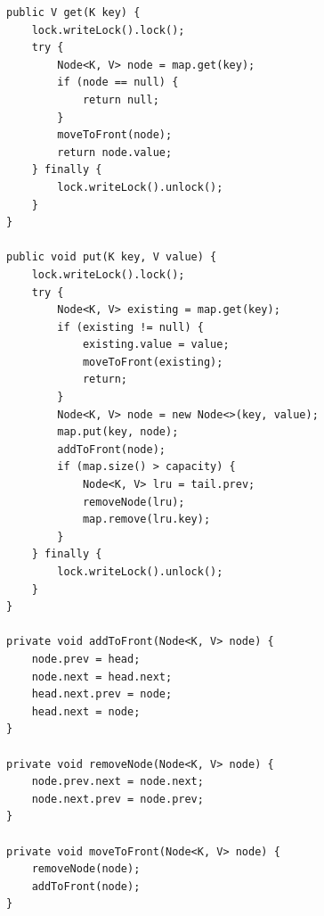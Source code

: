\documentclass[9pt,twocolumn,a4paper]{extarticle}
\newcommand{\code}[1]{\texttt{#1}}
\begin{document}
\begin{minipage}{\linewidth}
\begin{lstlisting}[caption={\code{datastructure/LRUCache.java}, \code{get}, \code{put} và các thao tác trên danh sách},label={lst:lru}]
public V get(K key) {
    lock.writeLock().lock();
    try {
        Node<K, V> node = map.get(key);
        if (node == null) {
            return null;
        }
        moveToFront(node);
        return node.value;
    } finally {
        lock.writeLock().unlock();
    }
}

public void put(K key, V value) {
    lock.writeLock().lock();
    try {
        Node<K, V> existing = map.get(key);
        if (existing != null) {
            existing.value = value;
            moveToFront(existing);
            return;
        }
        Node<K, V> node = new Node<>(key, value);
        map.put(key, node);
        addToFront(node);
        if (map.size() > capacity) {
            Node<K, V> lru = tail.prev;
            removeNode(lru);
            map.remove(lru.key);
        }
    } finally {
        lock.writeLock().unlock();
    }
}

private void addToFront(Node<K, V> node) {
    node.prev = head;
    node.next = head.next;
    head.next.prev = node;
    head.next = node;
}

private void removeNode(Node<K, V> node) {
    node.prev.next = node.next;
    node.next.prev = node.prev;
}

private void moveToFront(Node<K, V> node) {
    removeNode(node);
    addToFront(node);
}
\end{lstlisting}
\end{minipage}
\end{document}
